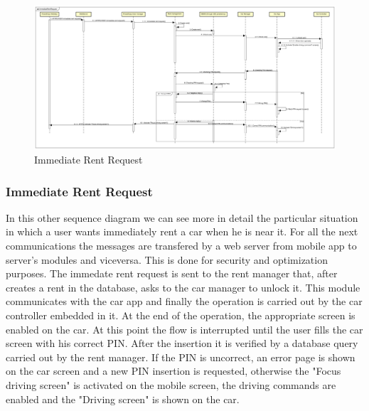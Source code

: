 \documentclass[english]{article}
\begin{document}
	\begin{landscape}
		\begin{figure}[H]
				\centering
				\includegraphics[scale=0.197]{./SequenceDiagrams/ImmediateRentRequest/ImmediateRentRequest.pdf}%
				\caption{Immediate Rent Request}
		\end{figure}
	\end{landscape}
		\subsubsection{Immediate Rent Request}
		In this other sequence diagram we can see more in detail the particular situation in which a user wants immediately rent a car when he is near it.
		For all the next communications the messages are transfered by a web server from mobile app to server's modules and viceversa. This is done for security and optimization purposes.
		The immedate rent request is sent to the rent manager that, after creates a rent in the database, asks to the car manager to unlock it. This module communicates with the car app and finally the operation is carried out by the car controller embedded in it. At the end of the operation, the appropriate screen is enabled on the car.
		At this point the flow is interrupted until the user fills the car screen with his correct PIN. After the insertion it is verified by a database query carried out by the rent manager. If the PIN is uncorrect, an error page is shown on the car screen and a new PIN insertion is requested, otherwise the "Focus driving screen" is activated on the mobile screen, the driving commands are enabled and the "Driving screen" is shown on the car. 
\end{document}
